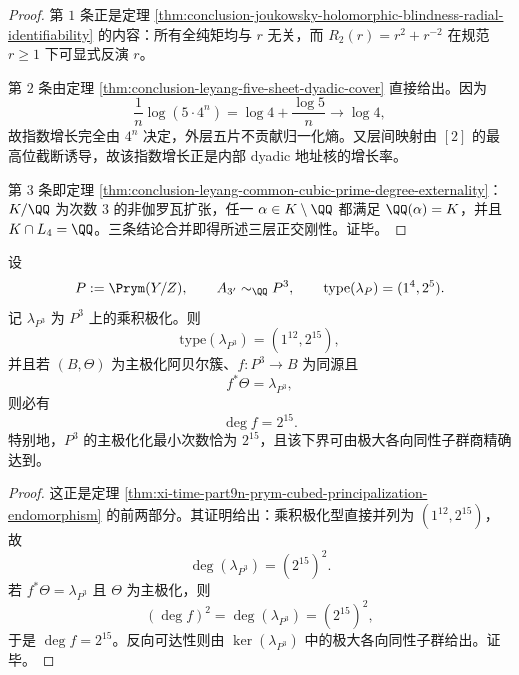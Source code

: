 \begin{proof}
第 \(1\) 条正是定理 \ref{thm:conclusion-joukowsky-holomorphic-blindness-radial-identifiability} 的内容：所有全纯矩均与 \(r\) 无关，而 \(R_2(r)=r^2+r^{-2}\) 在规范 \(r\ge 1\) 下可显式反演 \(r\)。

第 \(2\) 条由定理 \ref{thm:conclusion-leyang-five-sheet-dyadic-cover} 直接给出。因为
\[
\frac1n\log(5\cdot 4^n)=\log 4+\frac{\log 5}{n}\longrightarrow \log 4,
\]
故指数增长完全由 \(4^n\) 决定，外层五片不贡献归一化熵。又层间映射由 \([2]\) 的最高位截断诱导，故该指数增长正是内部 dyadic 地址核的增长率。

第 \(3\) 条即定理 \ref{thm:conclusion-leyang-common-cubic-prime-degree-externality}：\(K/\QQ\) 为次数 \(3\) 的非伽罗瓦扩张，任一 \(\alpha\in K\setminus \QQ\) 都满足 \(\QQ(\alpha)=K\)，并且 \(K\cap L_4=\QQ\)。三条结论合并即得所述三层正交刚性。证毕。
\end{proof}

\begin{theorem}\label{thm:conclusion-prym-cubed-principalization-cost-exact}
设
\[
P:=\Prym(Y/Z),
\qquad
A_{3'}\sim_{\QQ} P^3,
\qquad
\mathrm{type}(\lambda_P)=(1^4,2^5).
\]
记 \(\lambda_{P^3}\) 为 \(P^3\) 上的乘积极化。则
\[
\mathrm{type}(\lambda_{P^3})=(1^{12},2^{15}),
\]
并且若 \((B,\Theta)\) 为主极化阿贝尔簇、\(f:P^3\to B\) 为同源且
\[
f^\ast\Theta=\lambda_{P^3},
\]
则必有
\[
\deg f=2^{15}.
\]
特别地，\(P^3\) 的主极化化最小次数恰为 \(2^{15}\)，且该下界可由极大各向同性子群商精确达到。
\end{theorem}
\begin{proof}
这正是定理 \ref{thm:xi-time-part9n-prym-cubed-principalization-endomorphism} 的前两部分。其证明给出：乘积极化型直接并列为 \((1^{12},2^{15})\)，故
\[
\deg(\lambda_{P^3})=(2^{15})^2.
\]
若 \(f^\ast\Theta=\lambda_{P^3}\) 且 \(\Theta\) 为主极化，则
\[
(\deg f)^2=\deg(\lambda_{P^3})=(2^{15})^2,
\]
于是 \(\deg f=2^{15}\)。反向可达性则由 \(\ker(\lambda_{P^3})\) 中的极大各向同性子群给出。证毕。
\end{proof}

